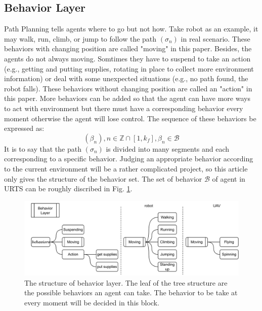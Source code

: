 \documentclass{ieeeaccess}
\begin{document}
\subsection{Behavior Layer}
Path Planning tells agents where to go but not how. Take robot as an example, it may walk, run, climb, or jump to follow the path $(\sigma_n)$ in real scenario. These behaviors with changing position are called "moving" in this paper. Besides, the agents do not always moving. Somtimes they have to suspend to take an action (e.g., getting and putting supplies, rotating in place to collect more environment information) or deal with some unexpected situations (e.g., no path found, the robot falls). These behaviors without changing position are called an "action" in this paper. More behaviors can be added so that the agent can have more ways to act with environment but there must have a corresponding behavior every moment otherwise the agent will lose control. The sequence of these behaviors be expressed as:
\begin{equation}
    (\beta_n), n\in\mathbb{Z}\cap[1,k_f], \beta_n\in\mathcal{B}
\end{equation}
It is to say that the path $(\sigma_n)$ is divided into many segments and each corresponding to a specific behavior. Judging an appropriate behavior according to the current environment will be a rather complicated project, so this article only gives the structure of the behavior set. The set of behavior $\mathcal{B}$ of agent in URTS can be roughly discribed in Fig. \ref{fig:behavior}.

\begin{figure}[htbp]
    \centering
    \includegraphics[scale=.5]{fig/behavior.pdf}\caption{The structure of behavior layer. The leaf of the tree structure are the possible behaviors an agent can take. The behavior to be take at every moment will be decided in this block.}%
    \label{fig:behavior}
\end{figure}
\end{document}

